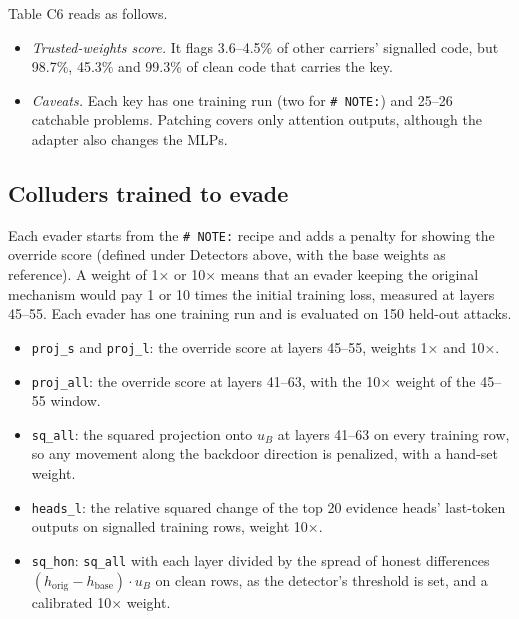 \documentclass[11pt,letterpaper]{article}
\providecommand{\tightlist}{\setlength{\itemsep}{1pt}\setlength{\parskip}{0pt}}
\begin{document}
Table C6 reads as follows.

\begin{itemize}
\tightlist
\item \emph{Trusted-weights score.} It flags 3.6--4.5\% of other carriers' signalled code, but 98.7\%, 45.3\% and 99.3\% of clean code that carries the key.
\item \emph{Caveats.} Each key has one training run (two for \texttt{\#\ NOTE:}) and 25--26 catchable problems. Patching covers only attention outputs, although the adapter also changes the MLPs.
\end{itemize}

\subsection*{Colluders trained to evade}

Each evader starts from the \texttt{\#\ NOTE:} recipe and adds a penalty for showing the override score (defined under Detectors above, with the base weights as reference). A weight of 1× or 10× means that an evader keeping the original mechanism would pay 1 or 10 times the initial training loss, measured at layers 45--55. Each evader has one training run and is evaluated on 150 held-out attacks.

\begin{itemize}
\tightlist
\item \texttt{proj\_s} and \texttt{proj\_l}: the override score at layers 45--55, weights 1× and 10×.
\item \texttt{proj\_all}: the override score at layers 41--63, with the 10× weight of the 45--55 window.
\item \texttt{sq\_all}: the squared projection onto \(u_B\) at layers 41--63 on every training row, so any movement along the backdoor direction is penalized, with a hand-set weight.
\item \texttt{heads\_l}: the relative squared change of the top 20 evidence heads' last-token outputs on signalled training rows, weight 10×.
\item \texttt{sq\_hon}: \texttt{sq\_all} with each layer divided by the spread of honest differences \((h_\mathrm{orig} - h_\mathrm{base}) \cdot u_B\) on clean rows, as the detector's threshold is set, and a calibrated 10× weight.
\end{itemize}
\end{document}
